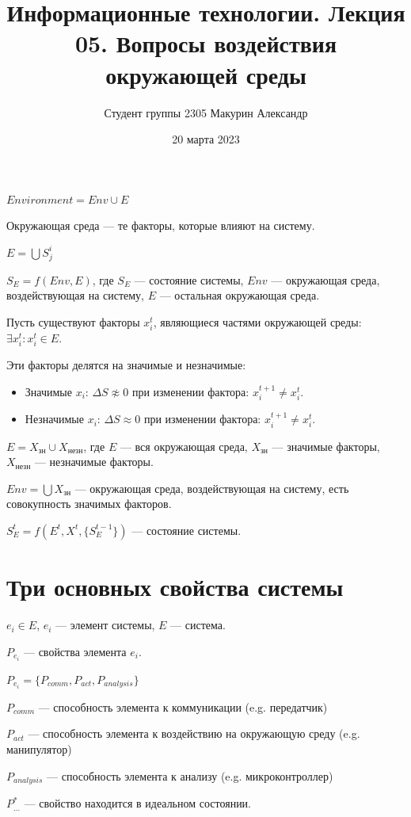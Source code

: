 \documentclass[12pt]{article}
\title{Информационные технологии. Лекция 05. Вопросы воздействия окружающей среды}
\author{Студент группы 2305 Макурин Александр}
\date{20 марта 2023}
\begin{document}
\maketitle
\begin{sloppypar}
    $Environment = Env \cup E$

    Окружающая среда — те факторы, которые влияют на систему.

    $E = \bigcup S^i_j$

    $S_E = f(Env, E)$, где $S_E$ — состояние системы, $Env$ — окружающая среда, воздействующая на систему, $E$ — остальная окружающая среда.

    Пусть существуют факторы $x_i^t$, являющиеся частями окружающей среды: $\exists x_i^t : x_i^t \in E$.

    Эти факторы делятся на значимые и незначимые:
    \begin{itemize}
        \item Значимые $x_i$: $\Delta S \not\approx 0$ при изменении фактора: $x_i^{t + 1} \neq x_i^t$.
        \item Незначимые $x_i$: $\Delta S \approx 0$ при изменении фактора: $x_i^{t + 1} \neq x_i^t$.
    \end{itemize}

    $E = X_{\text{зн}} \cup X_{\text{незн}}$, где $E$ — вся окружающая среда, $X_{\text{зн}}$ — значимые факторы, $X_{\text{незн}}$ — незначимые факторы.

    $Env = \bigcup X_{\text{зн}}$ — окружающая среда, воздействующая на систему, есть совокупность значимых факторов.

    $S_E^t = f(E^t, X^t, \{S_E^{t-1}\})$ — состояние системы.

    \section{Три основных свойства системы}
    $e_i \in E$, $e_i$ — элемент системы, $E$ — система.

    $P_{e_i}$ — свойства элемента $e_i$.

    $P_{e_i} = \{P_{comm}, P_{act}, P_{analysis}\}$

    $P_{comm}$ — способность элемента к коммуникации (e.g. передатчик)

    $P_{act}$ — способность элемента к воздействию на окружающую среду (e.g. манипулятор)

    $P_{analysis}$ — способность элемента к анализу (e.g. микроконтроллер)

    $P^*_{...}$ — свойство находится в идеальном состоянии.


\end{sloppypar}
\end{document}

